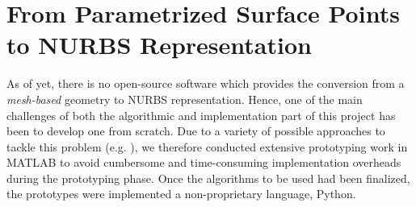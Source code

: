 \section{From Parametrized Surface Points to NURBS Representation}
As of yet, there is no open-source software which provides the conversion from a \textit{mesh-based} geometry to NURBS representation. Hence, one of the main challenges of both the algorithmic and implementation part of this project has been to develop one from scratch. Due to a variety of possible approaches to tackle this problem (e.g. \cite{ eck1996automatic, becker2011advanced}), we therefore conducted extensive prototyping work in MATLAB \cite{MATLAB} to avoid cumbersome and time-consuming implementation overheads during the prototyping phase. Once the algorithms to be used had been finalized, the prototypes were implemented a non-proprietary language, Python.

%

